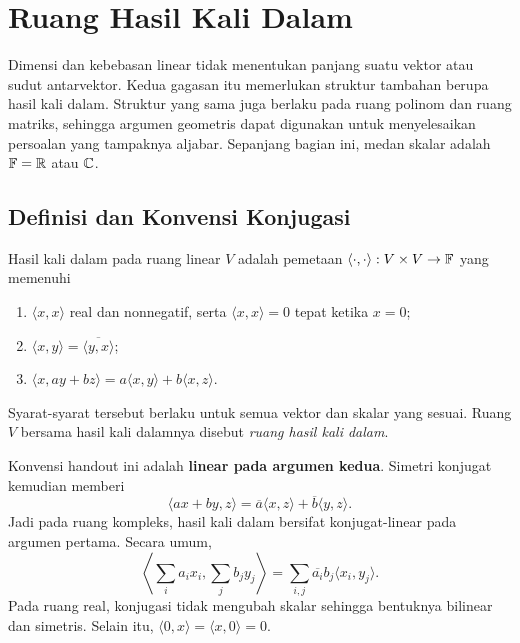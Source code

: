 \chapter{Ruang Hasil Kali Dalam}
\label{ch:hasil-kali-dalam}

Dimensi dan kebebasan linear tidak menentukan panjang suatu vektor
atau sudut antarvektor. Kedua gagasan itu memerlukan struktur
tambahan berupa hasil kali dalam. Struktur yang sama juga berlaku
pada ruang polinom dan ruang matriks, sehingga argumen geometris
dapat digunakan untuk menyelesaikan persoalan yang tampaknya aljabar.
Sepanjang bagian ini, medan skalar adalah $\mathbb{F}=\mathbb{R}$ atau $\mathbb{C}$.

\section{Definisi dan Konvensi Konjugasi}

\begin{definisi}
    Hasil kali dalam pada ruang linear $V$ adalah pemetaan
    $\langle\cdot,\cdot\rangle:V\times V\to\mathbb{F}$ yang memenuhi
    \begin{enumerate}[label=(\roman*),nosep]
        \item $\langle x,x\rangle$ real dan nonnegatif, serta
        $\langle x,x\rangle=0$ tepat ketika $x=0$;
        \item $\langle x,y\rangle=\overline{\langle y,x\rangle}$;
        \item $\langle x,ay+bz\rangle
        =a\langle x,y\rangle+b\langle x,z\rangle$.
    \end{enumerate}
    Syarat-syarat tersebut berlaku untuk semua vektor dan skalar
    yang sesuai. Ruang $V$ bersama hasil kali dalamnya disebut
    \emph{ruang hasil kali dalam}.
\end{definisi}

Konvensi handout ini adalah \textbf{linear pada argumen kedua}.
Simetri konjugat kemudian memberi
\[
    \langle ax+by,z\rangle
      =\overline a\langle x,z\rangle+\overline b\langle y,z\rangle.
\]
Jadi pada ruang kompleks, hasil kali dalam bersifat konjugat-linear
pada argumen pertama. Secara umum,
\[
    \left\langle\sum_i a_ix_i,\sum_j b_jy_j\right\rangle
      =\sum_{i,j}\overline{a_i}b_j\langle x_i,y_j\rangle.
\]
Pada ruang real, konjugasi tidak mengubah skalar sehingga bentuknya
bilinear dan simetris. Selain itu, $\langle0,x\rangle
=\langle x,0\rangle=0$.

